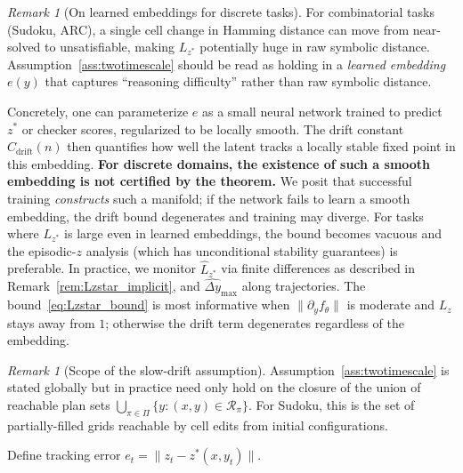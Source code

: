 \documentclass{article}
\theoremstyle{plain}
\theoremstyle{definition}
\theoremstyle{remark}
\newtheorem{remark}[theorem]{Remark}
\newcommand{\Cdrift}{C_{\mathrm{drift}}}
\begin{document}
\begin{remark}[On learned embeddings for discrete tasks]
\label{rem:reasoning_manifold}
For combinatorial tasks (Sudoku, ARC), a single cell change in Hamming distance can move from near-solved to unsatisfiable, making $L_{z^*}$ potentially huge in raw symbolic distance.
Assumption~\ref{ass:twotimescale} should be read as holding in a \emph{learned embedding} $e(y)$ that captures ``reasoning difficulty'' rather than raw symbolic distance.

Concretely, one can parameterize $e$ as a small neural network trained to predict $z^*$ or checker scores, regularized to be locally smooth.
The drift constant $\Cdrift(n)$ then quantifies how well the latent tracks a locally stable fixed point in this embedding.
\textbf{For discrete domains, the existence of such a smooth embedding is not certified by the theorem.}
We posit that successful training \emph{constructs} such a manifold; if the network fails to learn a smooth embedding, the drift bound degenerates and training may diverge.
For tasks where $L_{z^*}$ is large even in learned embeddings, the bound becomes vacuous and the episodic-$z$ analysis (which has unconditional stability guarantees) is preferable.
In practice, we monitor $\hat L_{z^*}$ via finite differences as described in Remark~\ref{rem:Lzstar_implicit}, and $\widehat{\Delta y}_{\max}$ along trajectories.
The bound~\eqref{eq:Lzstar_bound} is most informative when $\|\partial_y f_\theta\|$ is moderate and $L_z$ stays away from $1$; otherwise the drift term degenerates regardless of the embedding.
\end{remark}

\begin{remark}[Scope of the slow-drift assumption]
\label{rem:slowdrift_scope}
Assumption~\ref{ass:twotimescale} is stated globally but in practice need only hold on the closure of the union of reachable plan sets $\bigcup_{\pi \in \Pi} \{y : (x,y) \in \mathcal{R}_\pi\}$.
For Sudoku, this is the set of partially-filled grids reachable by cell edits from initial configurations.
\end{remark}

Define tracking error $e_t = \bigl\|z_t - z^*(x,y_t)\bigr\|$.
\end{document}
